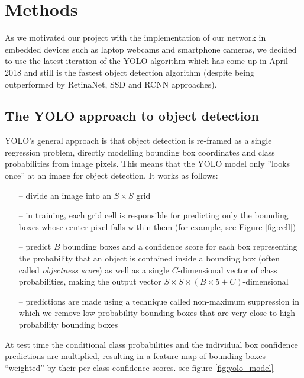 \documentclass[a4paper]{article}
\begin{document}
\section{Methods}
As we motivated our project with the implementation of our network in embedded devices such as laptop webcams and smartphone cameras, we decided to use the latest iteration of the YOLO algorithm which has come up in April 2018 and still is the fastest object detection algorithm (despite being outperformed by RetinaNet, SSD and RCNN approaches).
\subsection*{The YOLO approach to object detection}
YOLO's general approach is that object detection is re-framed as a single regression problem, directly
modelling bounding box coordinates and class
probabilities from image pixels. This means that the YOLO model only ”looks
once” at an image for object detection.
It works as follows: 
\begin{itemize}
\item[--] divide an image into an $S\times S$ grid
\item[--] in training, each grid cell is responsible for predicting only the bounding boxes whose center pixel falls within them (for example, see Figure \ref{fig:cell})
\item[--]  predict $B$ bounding boxes and a confidence score for each box representing the probability that an object is contained inside a bounding box (often called \textit{objectness score}) as well as a single $C$-dimensional vector of class probabilities, making the output vector $S \times S \times (B\times 5 +C)$-dimensional

\item[--]  predictions are made using a technique called non-maximum suppression in which we remove low probability bounding boxes that are very close to high probability bounding boxes
\end{itemize}  At test time the conditional class probabilities and the individual box confidence predictions are multiplied, resulting in a feature map of bounding boxes ``weighted'' by their per-class confidence scores. see figure \ref{fig:yolo_model}
\end{document}
